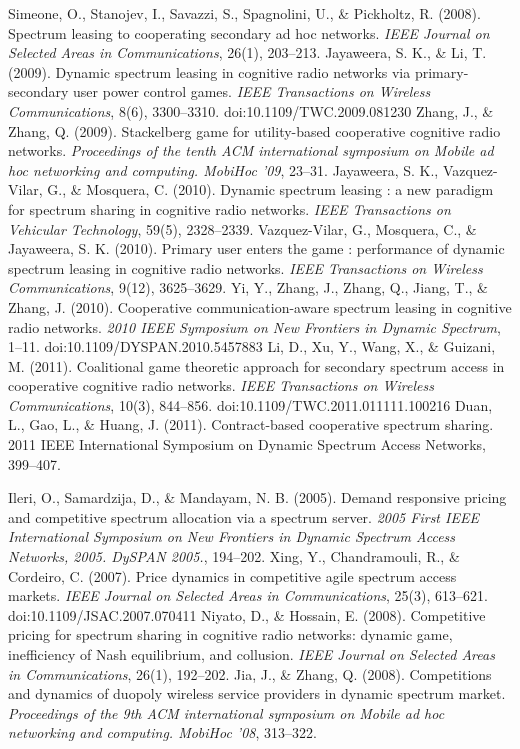 \begin{thebibliography}{1}
 Simeone, O., Stanojev, I., Savazzi, S., Spagnolini, U., \& Pickholtz, R. (2008). Spectrum leasing to cooperating secondary ad hoc networks. \textit{IEEE Journal on Selected Areas in Communications}, 26(1), 203–213.
 Jayaweera, S. K., \& Li, T. (2009). Dynamic spectrum leasing in cognitive radio networks via primary-secondary user power control games. \textit{IEEE Transactions on Wireless Communications}, 8(6), 3300–3310. doi:10.1109/TWC.2009.081230
 Zhang, J., \& Zhang, Q. (2009). Stackelberg game for utility-based cooperative cognitive radio networks. \textit{Proceedings of the tenth ACM international symposium on Mobile ad hoc networking and computing. MobiHoc ’09}, 23–31.
 Jayaweera, S. K., Vazquez-Vilar, G., \& Mosquera, C. (2010). Dynamic spectrum leasing : a new paradigm for spectrum sharing in cognitive radio networks. \textit{IEEE Transactions on Vehicular Technology}, 59(5), 2328–2339.  
 Vazquez-Vilar, G., Mosquera, C., \& Jayaweera, S. K. (2010). Primary user enters the game : performance of dynamic spectrum leasing in cognitive radio networks. \textit{IEEE Transactions on Wireless Communications}, 9(12), 3625–3629.
 Yi, Y., Zhang, J., Zhang, Q., Jiang, T., \& Zhang, J. (2010). Cooperative communication-aware spectrum leasing in cognitive radio networks. \textit{2010 IEEE Symposium on New Frontiers in Dynamic Spectrum}, 1–11. doi:10.1109/DYSPAN.2010.5457883
 Li, D., Xu, Y., Wang, X., \& Guizani, M. (2011). Coalitional game theoretic approach for secondary spectrum access in cooperative cognitive radio networks. \textit{IEEE Transactions on Wireless Communications}, 10(3), 844–856. doi:10.1109/TWC.2011.011111.100216
 Duan, L., Gao, L., \& Huang, J. (2011). Contract-based cooperative spectrum sharing. 2011 IEEE International Symposium on Dynamic Spectrum Access Networks, 399–407.  

 Ileri, O., Samardzija, D., \& Mandayam, N. B. (2005). Demand responsive pricing and competitive spectrum allocation via a spectrum server. \textit{2005 First IEEE International Symposium on New Frontiers in Dynamic Spectrum Access Networks, 2005. DySPAN 2005.}, 194–202.
 Xing, Y., Chandramouli, R., \& Cordeiro, C. (2007). Price dynamics in competitive agile spectrum access markets. \textit{IEEE Journal on Selected Areas in Communications}, 25(3), 613–621. doi:10.1109/JSAC.2007.070411
 Niyato, D., \& Hossain, E. (2008). Competitive pricing for spectrum sharing in cognitive radio networks: dynamic game, inefficiency of Nash equilibrium, and collusion. \textit{IEEE Journal on Selected Areas in Communications}, 26(1), 192–202.
 Jia, J., \& Zhang, Q. (2008). Competitions and dynamics of duopoly wireless service providers in dynamic spectrum market. \textit{Proceedings of the 9th ACM international symposium on Mobile ad hoc networking and computing. MobiHoc  ’08}, 313–322.


\end{thebibliography}
